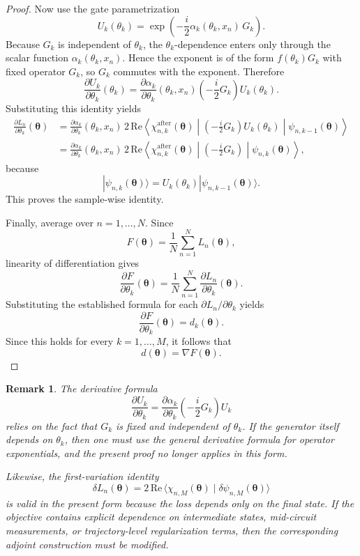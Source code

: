 \documentclass[aps,prb,10pt,twocolumn,superscriptaddress]{revtex4-2}
\newtheorem{remark}[theorem]{Remark}
\begin{document}
\begin{proof}
Now use the gate parametrization
\[
U_k(\theta_k)=\exp\!\left(-\frac{i}{2}\alpha_k(\theta_k,x_n)\,G_k\right).
\]
Because \(G_k\) is independent of \(\theta_k\), the \(\theta_k\)-dependence enters only through
the scalar function \(\alpha_k(\theta_k,x_n)\). Hence the exponent is of the form
\(f(\theta_k)G_k\) with fixed operator \(G_k\), so \(G_k\) commutes with the exponent.
Therefore
\[
\frac{\partial U_k}{\partial \theta_k}(\theta_k)
=
\frac{\partial \alpha_k}{\partial \theta_k}(\theta_k,x_n)
\left(-\frac{i}{2}G_k\right)
U_k(\theta_k).
\]
Substituting this identity yields
\begin{align*}
\frac{\partial L_n}{\partial \theta_k}(\bm{\theta})
&=
\frac{\partial \alpha_k}{\partial \theta_k}(\theta_k,x_n)\,
2\,\mathrm{Re}\!\left\langle
\chi_{n,k}^{\mathrm{after}}(\bm{\theta})
\middle|
\left(-\frac{i}{2}G_k\right)U_k(\theta_k)
\middle|
\psi_{n,k-1}(\bm{\theta})
\right\rangle \\
&=
\frac{\partial \alpha_k}{\partial \theta_k}(\theta_k,x_n)\,
2\,\mathrm{Re}\!\left\langle
\chi_{n,k}^{\mathrm{after}}(\bm{\theta})
\middle|
\left(-\frac{i}{2}G_k\right)
\middle|
\psi_{n,k}(\bm{\theta})
\right\rangle,
\end{align*}
because
\[
|\psi_{n,k}(\bm{\theta})\rangle
=
U_k(\theta_k)|\psi_{n,k-1}(\bm{\theta})\rangle.
\]
This proves the sample-wise identity.

Finally, average over \(n=1,\dots,N\). Since
\[
F(\bm{\theta})=\frac{1}{N}\sum_{n=1}^N L_n(\bm{\theta}),
\]
linearity of differentiation gives
\[
\frac{\partial F}{\partial \theta_k}(\bm{\theta})
=
\frac{1}{N}\sum_{n=1}^N \frac{\partial L_n}{\partial \theta_k}(\bm{\theta}).
\]
Substituting the established formula for each \(\partial L_n/\partial \theta_k\) yields
\[
\frac{\partial F}{\partial \theta_k}(\bm{\theta})=d_k(\bm{\theta}).
\]
Since this holds for every \(k=1,\dots,M\), it follows that
\[
d(\bm{\theta})=\nabla F(\bm{\theta}).
\]
\end{proof}

\begin{remark}
The derivative formula
\[
\frac{\partial U_k}{\partial \theta_k}
=
\frac{\partial \alpha_k}{\partial \theta_k}
\left(-\frac{i}{2}G_k\right)U_k
\]
relies on the fact that \(G_k\) is fixed and independent of \(\theta_k\). If the generator itself
depends on \(\theta_k\), then one must use the general derivative formula for operator exponentials,
and the present proof no longer applies in this form.

Likewise, the first-variation identity
\[
\delta L_n(\bm{\theta})
=
2\,\mathrm{Re}\,\langle \chi_{n,M}(\bm{\theta})\mid \delta\psi_{n,M}(\bm{\theta})\rangle
\]
is valid in the present form because the loss depends only on the final state. If the objective
contains explicit dependence on intermediate states, mid-circuit measurements, or trajectory-level
regularization terms, then the corresponding adjoint construction must be modified.
\end{remark}
\end{document}
